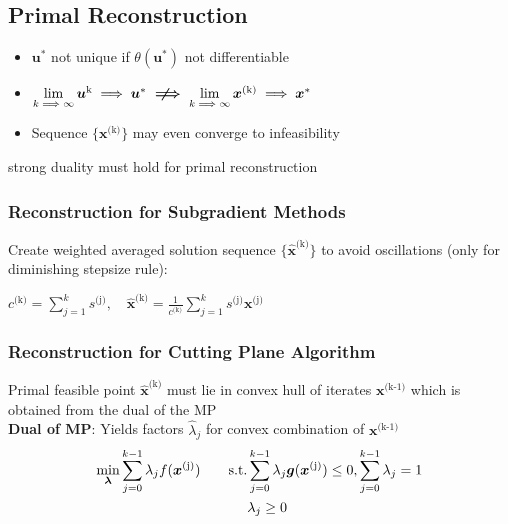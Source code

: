 \documentclass[english]{latex4ei/latex4ei_sheet}
\newcommand{\notimplies}{%
	\mathrel{{\ooalign{\hidewidth$\not\phantom{=}$\hidewidth\cr$\implies$}}}}
\begin{document}
\begin{sectionbox}
	\subsection{Primal Reconstruction}
	\begin{itemize}
		\item $\bm{u}^*$ not unique if $\theta(\bm{u}^*)$ not differentiable
		\item $\lim\limits_{k \implies \infty} \bm{u}^{\text{k}} \implies \bm{u}^* \bm{\notimplies} \lim\limits_{k \implies \infty} \bm{x}^{\text{(k)}} \implies \bm{x}^*$
		\item Sequence $\{\bm{x}^{\text{(k)}}\}$ may even converge to infeasibility
	\end{itemize}

	\begin{emphbox}
		strong duality must hold for primal reconstruction
	\end{emphbox}
	\vspace{0.5em}
	\subsubsection{Reconstruction for Subgradient Methods}
	Create weighted averaged solution sequence $\{\hat{\bm{x}}^{\text{(k)}}\}$ to avoid oscillations (only for diminishing stepsize rule):
	\begin{center}
		$c^{\text{(k)}} = \sum_{j=1}^{k} s^{\text{(j)}}, \quad \hat{\bm{x}}^{\text{(k)}} = \frac{1}{c^{\text{(k)}}} \sum\limits_{j=1}^{k} s^{\text{(j)}} \bm{x}^{\text{(j)}}$
	\end{center}
	\vspace{0.5em}

	\subsubsection{Reconstruction for Cutting Plane Algorithm}
	Primal feasible point $\hat{\bm{x}}^{\text{(k)}}$ must lie in convex hull of iterates $\bm{x}^{\text{(k-1)}}$ which is obtained from the dual of the MP \\
	\textbf{Dual of MP}: Yields factors $\hat{\lambda}_j$ for convex combination of $\bm{x}^{\text{(k-1)}}$ \\
	\begin{align}
		\min\limits_{\bm{\lambda}} \sum\limits_{j=0}^{k-1} \lambda_j f(\bm{x}^{\text{(j)}}) \qquad \text{s.t.} & \sum\limits_{j=0}^{k-1} \lambda_j \bm{g}(\bm{x}^{\text{(j)}}) \leq 0, \sum\limits_{j=0}^{k-1} \lambda_j = 1 \notag\\
		& \lambda_j \geq 0 \notag
	\end{align}


\end{sectionbox}
\end{document}
